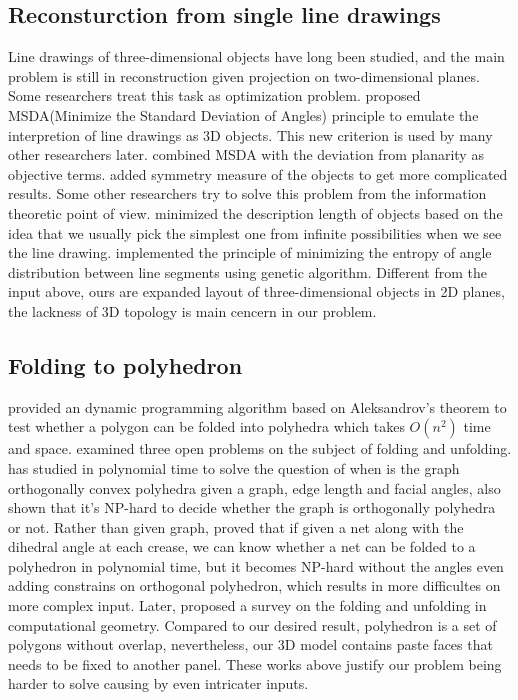 \documentclass[submission]{gmp2018}
\begin{document}
\subsection{Reconsturction from single line drawings} 
Line drawings of three-dimensional objects have long been studied, and the main problem is still in reconstruction given projection on two-dimensional planes. Some researchers treat this task as optimization problem. \cite{Marill:1991:EHI:113057.113061} proposed MSDA(Minimize the Standard Deviation of Angles) principle to emulate the interpretion of line drawings as 3D objects. This new criterion is used by many other researchers later. \cite{Leclerc1992An} combined MSDA with the deviation from planarity as objective terms. \cite{Cao:2005:ORS:1097114.1097658} added symmetry measure of the objects to get more complicated results. Some other researchers try to solve this problem from the information theoretic point of view. \cite{Marill1992Why} minimized the description length of objects based on the idea that we usually pick the simplest one from infinite possibilities when we see the line drawing. \cite{Shoji20013} implemented the principle of minimizing the entropy of angle distribution between line segments using genetic algorithm. Different from the input above, ours are expanded layout of three-dimensional objects in 2D planes, the lackness of 3D topology is main cencern in our problem.

\subsection{Folding to polyhedron} 
\cite{Lubiw1996When} provided an dynamic programming algorithm based on Aleksandrov's theorem to test whether a polygon can be folded into polyhedra which takes $O(n^2)$ time and space. \cite{O'Rourke:1998:FUC:646319.686376} examined three open problems on the subject of folding and unfolding. \cite{Biedl2004When} has studied in polynomial time to solve the question of when is the graph  orthogonally convex polyhedra given a graph, edge length and facial angles, also shown that it's NP-hard to decide whether the graph is orthogonally polyhedra or not. Rather than given graph, \cite{Biedl:2005:NFP:1090462.1646553} proved that if given a net along with the dihedral angle at each crease, we can know whether a net can be folded to a polyhedron in polynomial time, but it becomes NP-hard without the angles even adding constrains on orthogonal polyhedron, which results in more difficultes on more complex input. Later, \cite{Demaine2010A} proposed a survey on the folding and unfolding in computational geometry. Compared to our desired result, polyhedron is a set of polygons without overlap, nevertheless, our 3D model contains paste faces that needs to be fixed to another panel. These works above justify our problem being harder to solve causing by even intricater inputs.
\end{document}
